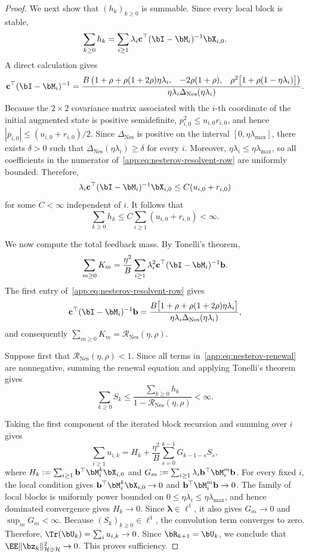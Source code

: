 \begin{proof}
We next show that \((h_k)_{k\geq0}\) is summable. Since every local block is stable,
\[
\sum_{k\geq0}h_k=\sum_{i\geq1}\lambda_i\mathbf c^\top(\bI-\bM_i)^{-1}\bX_{i,0}.
\]
A direct calculation gives
\begin{equation}
\label{app:eq:nesterov-resolvent-row}
\mathbf c^\top(\bI-\bM_i)^{-1}
=
\frac{B\begin{pmatrix}
1+\rho+\rho(1+2\rho)\eta\lambda_i,&
-2\rho(1+\rho),&
\rho^2\big[1+\rho(1-\eta\lambda_i)\big]
\end{pmatrix}}
{\eta\lambda_i\Delta_{\mathrm{Nes}}(\eta\lambda_i)}.
\end{equation}
Because the \(2\times2\) covariance matrix associated with the \(i\)-th coordinate of the initial augmented state is positive semidefinite, \(p_{i,0}^2\leq u_{i,0}r_{i,0}\), and hence \(|p_{i,0}|\leq(u_{i,0}+r_{i,0})/2\). Since \(\Delta_{\mathrm{Nes}}\) is positive on the interval \([0,\eta\lambda_{\max}]\), there exists \(\delta>0\) such that \(\Delta_{\mathrm{Nes}}(\eta\lambda_i)\geq\delta\) for every \(i\). Moreover, \(\eta\lambda_i\leq\eta\lambda_{\max}\), so all coefficients in the numerator of~\eqref{app:eq:nesterov-resolvent-row} are uniformly bounded. Therefore,
\[
\lambda_i\mathbf c^\top(\bI-\bM_i)^{-1}\bX_{i,0}\leq C(u_{i,0}+r_{i,0})
\]
for some \(C<\infty\) independent of \(i\). It follows that
\[
\sum_{k\geq0}h_k\leq C\sum_{i\geq1}(u_{i,0}+r_{i,0})<\infty.
\]

We now compute the total feedback mass. By Tonelli's theorem,
\[
\sum_{m\geq0}K_m=\frac{\eta^2}{B}\sum_{i\geq1}\lambda_i^2\mathbf c^\top(\bI-\bM_i)^{-1}\mathbf b.
\]
The first entry of~\eqref{app:eq:nesterov-resolvent-row} gives
\[
\mathbf c^\top(\bI-\bM_i)^{-1}\mathbf b
=
\frac{B\big[1+\rho+\rho(1+2\rho)\eta\lambda_i\big]}{\eta\lambda_i\Delta_{\mathrm{Nes}}(\eta\lambda_i)},
\]
and consequently \(\sum_{m\geq0}K_m=\mathcal R_{\mathrm{Nes}}(\eta,\rho)\).

Suppose first that \(\mathcal R_{\mathrm{Nes}}(\eta,\rho)<1\). Since all terms in~\eqref{app:eq:nesterov-renewal} are nonnegative, summing the renewal equation and applying Tonelli's theorem gives
\[
\sum_{k\geq0}S_k\leq\frac{\sum_{k\geq0}h_k}{1-\mathcal R_{\mathrm{Nes}}(\eta,\rho)}<\infty.
\]

Taking the first component of the iterated block recursion and summing over \(i\) gives
\[
\sum_{i\geq1}u_{i,k}=H_k+\frac{\eta^2}{B}\sum_{s=0}^{k-1}G_{k-1-s}S_s,
\]
where \(H_k:=\sum_{i\geq1}\mathbf b^\top\bM_i^k\bX_{i,0}\) and \(G_m:=\sum_{i\geq1}\lambda_i\mathbf b^\top\bM_i^m\mathbf b\). For every fixed \(i\), the local condition gives \(\mathbf b^\top\bM_i^k\bX_{i,0}\to0\) and \(\mathbf b^\top\bM_i^m\mathbf b\to0\). The family of local blocks is uniformly power bounded on \(0\leq\eta\lambda_i\leq\eta\lambda_{\max}\), and hence dominated convergence gives \(H_k\to0\). Since \(\bm\lambda\in\ell^1\), it also gives \(G_m\to0\) and \(\sup_mG_m<\infty\). Because \((S_k)_{k\geq0}\in\ell^1\), the convolution term converges to zero. Therefore, \(\Tr(\bU_k)=\sum_i u_{i,k}\to0\). Since \(\bR_{k+1}=\bU_k\), we conclude that \(\EE\|\bz_k\|_{\mathcal H\oplus\mathcal H}^2\to0\). This proves sufficiency.


\end{proof}

